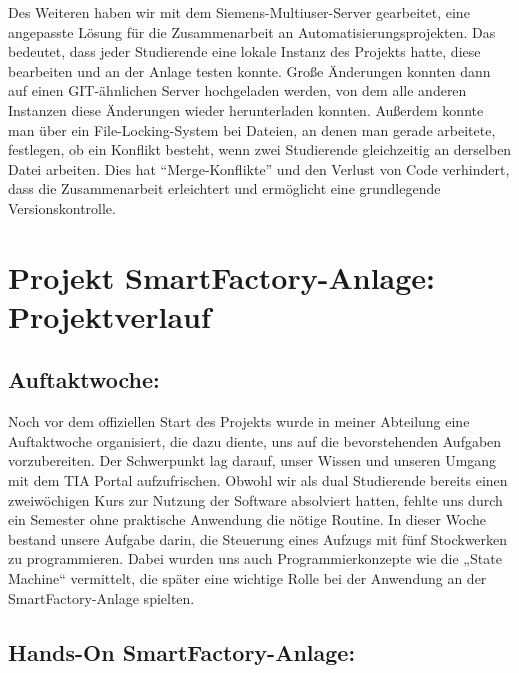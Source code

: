 Des Weiteren haben wir mit dem Siemens-Multiuser-Server gearbeitet, eine angepasste Lösung für die Zusammenarbeit an 
Automatisierungsprojekten. Das bedeutet, dass jeder Studierende eine lokale 
Instanz des Projekts hatte, diese bearbeiten und an der Anlage testen konnte. Große Änderungen konnten dann auf einen 
GIT-ähnlichen Server hochgeladen werden, von dem alle anderen Instanzen diese Änderungen wieder herunterladen konnten. 
Außerdem konnte man über ein File-Locking-System bei Dateien, an denen man gerade arbeitete, festlegen, ob ein Konflikt 
besteht, wenn zwei Studierende gleichzeitig an derselben Datei arbeiten. Dies hat ``Merge-Konflikte'' und den Verlust 
von Code verhindert, dass die Zusammenarbeit erleichtert und ermöglicht eine grundlegende Versionskontrolle.

\section{Projekt SmartFactory-Anlage: Projektverlauf}
\subsection{Auftaktwoche:}

Noch vor dem offiziellen Start des Projekts wurde in meiner Abteilung eine Auftaktwoche organisiert, die dazu diente, 
uns auf die bevorstehenden Aufgaben vorzubereiten. Der Schwerpunkt lag darauf, unser Wissen und unseren Umgang mit dem 
TIA Portal aufzufrischen. Obwohl wir als dual Studierende bereits einen zweiwöchigen Kurs zur Nutzung der Software 
absolviert hatten, fehlte uns durch ein Semester ohne praktische Anwendung die nötige Routine. In dieser Woche bestand 
unsere Aufgabe darin, die Steuerung eines Aufzugs mit fünf Stockwerken zu programmieren. Dabei wurden uns auch 
Programmierkonzepte wie die „State Machine“ vermittelt, die später eine wichtige Rolle bei der Anwendung an der 
SmartFactory-Anlage spielten.
\subsection{Hands-On SmartFactory-Anlage:}

